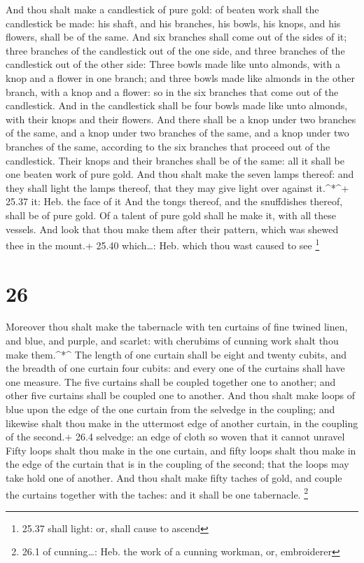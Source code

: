  And thou shalt make a candlestick of pure gold: of beaten
work shall the candlestick be made: his shaft, and his branches, his
bowls, his knops, and his flowers, shall be of the same. 
And six branches shall come out of the sides of it; three branches of
the candlestick out of the one side, and three branches of the
candlestick out of the other side:  Three bowls made like
unto almonds, with a knop and a flower in one branch; and three bowls
made like almonds in the other branch, with a knop and a flower: so in
the six branches that come out of the candlestick.  And in
the candlestick shall be four bowls made like unto almonds, with their
knops and their flowers.  And there shall be a knop under
two branches of the same, and a knop under two branches of the same, and
a knop under two branches of the same, according to the six branches
that proceed out of the candlestick.  Their knops and their
branches shall be of the same: all it shall be one beaten work of pure
gold.  And thou shalt make the seven lamps thereof: and
they shall light the lamps thereof, that they may give light over
against it.\^{}*\^{}+ 25.37 it: Heb. the face of it  And
the tongs thereof, and the snuffdishes thereof, shall be of pure gold.
 Of a talent of pure gold shall he make it, with all these
vessels.  And look that thou make them after their pattern,
which was shewed thee in the mount.+ 25.40 which\ldots: Heb. which thou
wast caused to see \footnote{25.37 shall light: or, shall cause to
  ascend}

\hypertarget{section-25}{%
\section{26}\label{section-25}}

 Moreover thou shalt make the tabernacle with ten curtains
of fine twined linen, and blue, and purple, and scarlet: with cherubims
of cunning work shalt thou make them.\^{}*\^{}  The length
of one curtain shall be eight and twenty cubits, and the breadth of one
curtain four cubits: and every one of the curtains shall have one
measure.  The five curtains shall be coupled together one to
another; and other five curtains shall be coupled one to another.
 And thou shalt make loops of blue upon the edge of the one
curtain from the selvedge in the coupling; and likewise shalt thou make
in the uttermost edge of another curtain, in the coupling of the
second.+ 26.4 selvedge: an edge of cloth so woven that it cannot unravel
 Fifty loops shalt thou make in the one curtain, and fifty
loops shalt thou make in the edge of the curtain that is in the coupling
of the second; that the loops may take hold one of another. 
And thou shalt make fifty taches of gold, and couple the curtains
together with the taches: and it shall be one tabernacle. \footnote{26.1
  of cunning\ldots: Heb. the work of a cunning workman, or, embroiderer}

